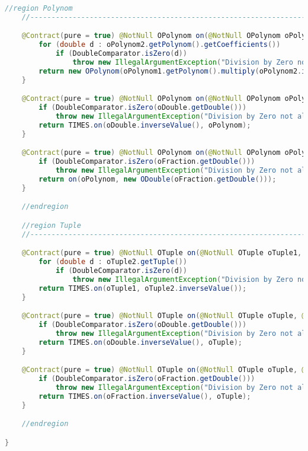 \begin{lstlisting}[caption=Slash (Falk),label=list:Slash,language=Java]
    //region Polynom
    //------------------------------------------------------------------------------------

    @Contract(pure = true) @NotNull OPolynom on(@NotNull OPolynom oPolynom1, @NotNull OPolynom oPolynom2) {
        for (double d : oPolynom2.getPolynom().getCoefficients())
            if (DoubleComparator.isZero(d))
                throw new IllegalArgumentException("Division by Zero not allowed");
        return new OPolynom(oPolynom1.getPolynom().multiply(oPolynom2.inverseValue().getPolynom()));
    }

    @Contract(pure = true) @NotNull OPolynom on(@NotNull OPolynom oPolynom, @NotNull ODouble oDouble) {
        if (DoubleComparator.isZero(oDouble.getDouble()))
            throw new IllegalArgumentException("Division by Zero not allowed");
        return TIMES.on(oDouble.inverseValue(), oPolynom);
    }

    @Contract(pure = true) @NotNull OPolynom on(@NotNull OPolynom oPolynom, @NotNull OFraction oFraction) {
        if (DoubleComparator.isZero(oFraction.getDouble()))
            throw new IllegalArgumentException("Division by Zero not allowed");
        return on(oPolynom, new ODouble(oFraction.getDouble()));
    }

    //endregion

    //region Tuple
    //------------------------------------------------------------------------------------

    @Contract(pure = true) @NotNull OTuple on(@NotNull OTuple oTuple1, @NotNull OTuple oTuple2) {
        for (double d : oTuple2.getTuple())
            if (DoubleComparator.isZero(d))
                throw new IllegalArgumentException("Division by Zero not allowed");
        return TIMES.on(oTuple1, oTuple2.inverseValue());
    }

    @Contract(pure = true) @NotNull OTuple on(@NotNull OTuple oTuple, @NotNull ODouble oDouble) {
        if (DoubleComparator.isZero(oDouble.getDouble()))
            throw new IllegalArgumentException("Division by Zero not allowed");
        return TIMES.on(oDouble.inverseValue(), oTuple);
    }

    @Contract(pure = true) @NotNull OTuple on(@NotNull OTuple oTuple, @NotNull OFraction oFraction) {
        if (DoubleComparator.isZero(oFraction.getDouble()))
            throw new IllegalArgumentException("Division by Zero not allowed");
        return TIMES.on(oFraction.inverseValue(), oTuple);
    }

    //endregion

}
\end{lstlisting}    

